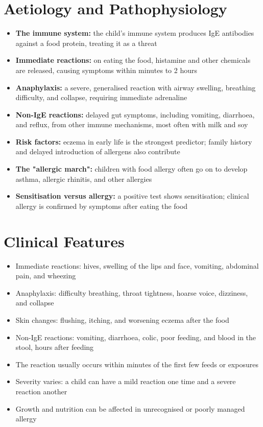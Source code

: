\section*{Aetiology and Pathophysiology}
\begin{itemize}
    \item \textbf{The immune system:} the child's immune system produces IgE antibodies against a food protein, treating it as a threat
    \item \textbf{Immediate reactions:} on eating the food, histamine and other chemicals are released, causing symptoms within minutes to 2 hours
    \item \textbf{Anaphylaxis:} a severe, generalised reaction with airway swelling, breathing difficulty, and collapse, requiring immediate adrenaline
    \item \textbf{Non-IgE reactions:} delayed gut symptoms, including vomiting, diarrhoea, and reflux, from other immune mechanisms, most often with milk and soy
    \item \textbf{Risk factors:} eczema in early life is the strongest predictor; family history and delayed introduction of allergens also contribute
    \item \textbf{The "allergic march":} children with food allergy often go on to develop asthma, allergic rhinitis, and other allergies
    \item \textbf{Sensitisation versus allergy:} a positive test shows sensitisation; clinical allergy is confirmed by symptoms after eating the food
\end{itemize}

\section*{Clinical Features}
\begin{itemize}
    \item Immediate reactions: hives, swelling of the lips and face, vomiting, abdominal pain, and wheezing
    \item Anaphylaxis: difficulty breathing, throat tightness, hoarse voice, dizziness, and collapse
    \item Skin changes: flushing, itching, and worsening eczema after the food
    \item Non-IgE reactions: vomiting, diarrhoea, colic, poor feeding, and blood in the stool, hours after feeding
    \item The reaction usually occurs within minutes of the first few feeds or exposures
    \item Severity varies: a child can have a mild reaction one time and a severe reaction another
    \item Growth and nutrition can be affected in unrecognised or poorly managed allergy
\end{itemize}

